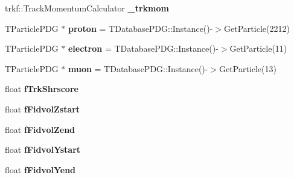 \begin{DoxyCompactItemize}
\item 
\hypertarget{classselection_1_1CC0piNpSelection_a82c14d3fa8ea4b3edff07521b2f7c1b9}{trkf\-::\-Track\-Momentum\-Calculator {\bfseries \-\_\-trkmom}}\label{classselection_1_1CC0piNpSelection_a82c14d3fa8ea4b3edff07521b2f7c1b9}

\item 
\hypertarget{classselection_1_1CC0piNpSelection_a721706e2b68efe51225fa6388bc184d1}{T\-Particle\-P\-D\-G $\ast$ {\bfseries proton} = T\-Database\-P\-D\-G\-::\-Instance()-\/$>$Get\-Particle(2212)}\label{classselection_1_1CC0piNpSelection_a721706e2b68efe51225fa6388bc184d1}

\item 
\hypertarget{classselection_1_1CC0piNpSelection_ad04f8899cec1c9c54e720126e61a872f}{T\-Particle\-P\-D\-G $\ast$ {\bfseries electron} = T\-Database\-P\-D\-G\-::\-Instance()-\/$>$Get\-Particle(11)}\label{classselection_1_1CC0piNpSelection_ad04f8899cec1c9c54e720126e61a872f}

\item 
\hypertarget{classselection_1_1CC0piNpSelection_ae1161170f7b46e368ad608924cc412fd}{T\-Particle\-P\-D\-G $\ast$ {\bfseries muon} = T\-Database\-P\-D\-G\-::\-Instance()-\/$>$Get\-Particle(13)}\label{classselection_1_1CC0piNpSelection_ae1161170f7b46e368ad608924cc412fd}

\item 
\hypertarget{classselection_1_1CC0piNpSelection_ab72eccf7dab3acafa294a0d8f3e225a0}{float {\bfseries f\-Trk\-Shrscore}}\label{classselection_1_1CC0piNpSelection_ab72eccf7dab3acafa294a0d8f3e225a0}

\item 
\hypertarget{classselection_1_1CC0piNpSelection_afe5a2b82ecad103b98362839094c47e0}{float {\bfseries f\-Fidvol\-Zstart}}\label{classselection_1_1CC0piNpSelection_afe5a2b82ecad103b98362839094c47e0}

\item 
\hypertarget{classselection_1_1CC0piNpSelection_a9ac28bcb4ef95573d416dec35202b18e}{float {\bfseries f\-Fidvol\-Zend}}\label{classselection_1_1CC0piNpSelection_a9ac28bcb4ef95573d416dec35202b18e}

\item 
\hypertarget{classselection_1_1CC0piNpSelection_ac59a66f695af8314018029e4480db16a}{float {\bfseries f\-Fidvol\-Ystart}}\label{classselection_1_1CC0piNpSelection_ac59a66f695af8314018029e4480db16a}

\item 
\hypertarget{classselection_1_1CC0piNpSelection_a4732dc1091cb1881c741d57f999b5035}{float {\bfseries f\-Fidvol\-Yend}}\label{classselection_1_1CC0piNpSelection_a4732dc1091cb1881c741d57f999b5035}


\end{DoxyCompactItemize}
